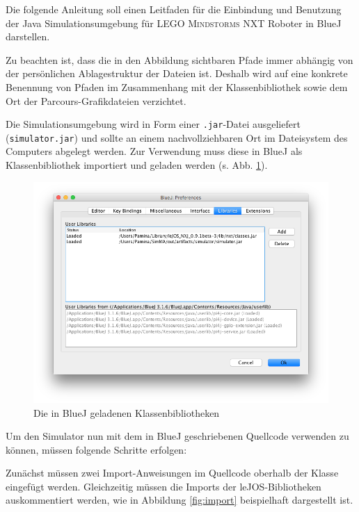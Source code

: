 \documentclass[paper=a4, DIV=calc, BCOR=12mm, twoside=on, onecolumn=on, open = right, titlepage =on, parskip =half-, headsepline = on, footsepline = off, chapterprefix = off, appendixprefix = on, fontsize = 12pt, numbers = noenddot, abstract = on]{scrbook}
\begin{document}
Die folgende Anleitung soll einen Leitfaden für die Einbindung und Benutzung der Java Simulationsumgebung für \textsc{LEGO Mindstorms} NXT Roboter in BlueJ darstellen.

Zu beachten ist, dass die in den Abbildung sichtbaren Pfade immer abhängig von der persönlichen Ablagestruktur der Dateien ist. Deshalb wird auf eine konkrete Benennung von Pfaden im Zusammenhang mit der Klassenbibliothek sowie dem Ort der Parcours-Grafikdateien verzichtet.




Die Simulationsumgebung wird in Form einer \texttt{.jar}-Datei ausgeliefert (\texttt{simulator.jar}) und sollte an einem nachvollziehbaren Ort im Dateisystem des Computers abgelegt werden. Zur Verwendung muss diese in BlueJ als Klassenbibliothek importiert und geladen werden (s. Abb. \ref{fig:library}).

\begin{figure}[htb]
\centering
\includegraphics[width=\textwidth]{images/Anleitung_Library.png}
\caption{Die in BlueJ geladenen Klassenbibliotheken}
\label{fig:library}
\end{figure}


Um den Simulator nun mit dem in BlueJ geschriebenen Quellcode verwenden zu können, müssen folgende Schritte erfolgen:

Zunächst müssen zwei Import-Anweisungen im Quellcode oberhalb der Klasse eingefügt werden. Gleichzeitig müssen die Imports der leJOS-Bibliotheken auskommentiert werden, wie in Abbildung \ref{fig:import} beispielhaft dargestellt ist.
\end{document}
